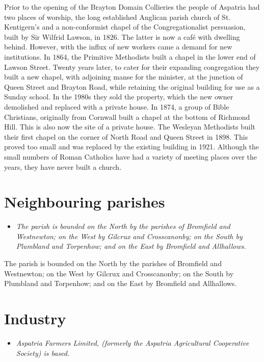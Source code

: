Prior to the opening of the Brayton Domain Collieries the people of
Aspatria had two places of worship, the long established Anglican parish
church of St. Kentigern's and a non-conformist chapel of the
Congregationalist persuasion, built by Sir Wilfrid Lawson, in 1826. The
latter is now a café with dwelling behind. However, with the influx of
new workers came a demand for new institutions. In 1864, the Primitive
Methodists built a chapel in the lower end of Lawson Street. Twenty
years later, to cater for their expanding congregation they built a new
chapel, with adjoining manse for the minister, at the junction of Queen
Street and Brayton Road, while retaining the original building for use
as a Sunday school. In the 1980s they sold the property, which the new
owner demolished and replaced with a private house. In 1874, a group of
Bible Christians, originally from Cornwall built a chapel at the bottom
of Richmond Hill. This is also now the site of a private house. The
Wesleyan Methodists built their first chapel on the corner of North Road
and Queen Street in 1898. This proved too small and was replaced by the
existing building in 1921. Although the small numbers of Roman Catholics
have had a variety of meeting places over the years, they have never
built a church.

\section{Neighbouring parishes}\label{neighbouring-parishes}

\begin{itemize}
\item
  \emph{The parish is bounded on the North by the parishes of Bromfield
  and Westnewton; on the West by Gilcrux and Crosscanonby; on the South
  by Plumbland and Torpenhow; and on the East by Bromfield and
  Allhallows.}
\end{itemize}

The parish is bounded on the North by the parishes of Bromfield and
Westnewton; on the West by Gilcrux and Crosscanonby; on the South by
Plumbland and Torpenhow; and on the East by Bromfield and Allhallows.

\section{Industry}\label{industry}

\begin{itemize}
\item
  \emph{Aspatria Farmers Limited, (formerly the Aspatria Agricultural
  Cooperative Society) is based.}
\end{itemize}

